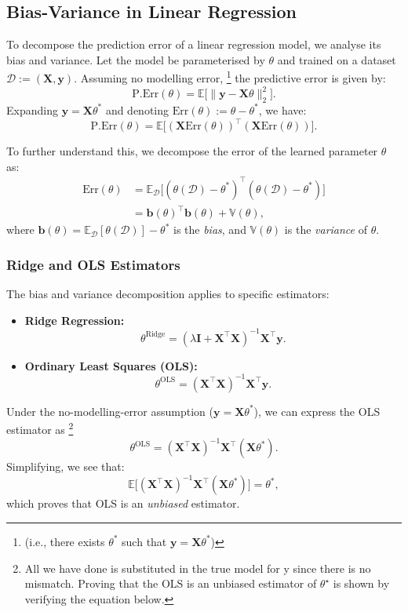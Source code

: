 \subsection{Bias-Variance in Linear Regression}

To decompose the prediction error of a linear regression model, we analyse its bias and variance. Let the model be parameterised by \(\theta\) and trained on a dataset \(\mathcal{D} := (\mathbf{X}, \mathbf{y})\). Assuming no modelling error, \footnote{(i.e., there exists \(\theta^*\) such that \(\mathbf{y} = \mathbf{X}\theta^*\))} the predictive error is given by:
\[
    \mathrm{P.Err}(\theta) = \mathbb{E}\big[ \|\mathbf{y} - \mathbf{X}\theta\|_2^2 \big].
\]
Expanding \(\mathbf{y} = \mathbf{X}\theta^*\) and denoting \(\mathrm{Err}(\theta) := \theta - \theta^*\), we have:
\[
    \mathrm{P.Err}(\theta) = \mathbb{E}\big[(\mathbf{X}\mathrm{Err}(\theta))^\top (\mathbf{X}\mathrm{Err}(\theta))\big].
\]

To further understand this, we decompose the error of the learned parameter \(\theta\) as:
\begin{align*}
    \text{Err}(\theta) & = \mathbb{E}_{\mathcal{D}}\big[(\theta(\mathcal{D}) - \theta^*)^\top (\theta(\mathcal{D}) - \theta^*)\big] \\
                       & = \mathbf{b}(\theta)^\top \mathbf{b}(\theta) + \mathbb{V}(\theta),
\end{align*}
where \(\mathbf{b}(\theta) = \mathbb{E}_{\mathcal{D}}[\theta(\mathcal{D})] - \theta^*\) is the \textit{bias}, and \(\mathbb{V}(\theta)\) is the \textit{variance} of \(\theta\).

\subsubsection{Ridge and OLS Estimators}
The bias and variance decomposition applies to specific estimators:
\begin{itemize}
    \item \textbf{Ridge Regression:}
          \[
              \theta^{\text{Ridge}} = (\lambda \mathbf{I} + \mathbf{X}^\top \mathbf{X})^{-1} \mathbf{X}^\top \mathbf{y}.
          \]
    \item \textbf{Ordinary Least Squares (OLS):}
          \[
              \theta^{\text{OLS}} = (\mathbf{X}^\top \mathbf{X})^{-1} \mathbf{X}^\top \mathbf{y}.
          \]
\end{itemize}

Under the no-modelling-error assumption (\(\mathbf{y} = \mathbf{X}\theta^*\)), we can express the OLS estimator as \footnote{All we have done is substituted in the true model for y since there is no mismatch. Proving
    that the OLS is an unbiased estimator of $\theta^\star$ is shown by verifying the equation below.}
\[
    \theta^{\text{OLS}} = (\mathbf{X}^\top \mathbf{X})^{-1} \mathbf{X}^\top (\mathbf{X}\theta^*).
\]
Simplifying, we see that:
\[
    \mathbb{E}\big[(\mathbf{X}^\top \mathbf{X})^{-1} \mathbf{X}^\top (\mathbf{X}\theta^*)\big] = \theta^*,
\]
which proves that OLS is an \textit{unbiased} estimator.

